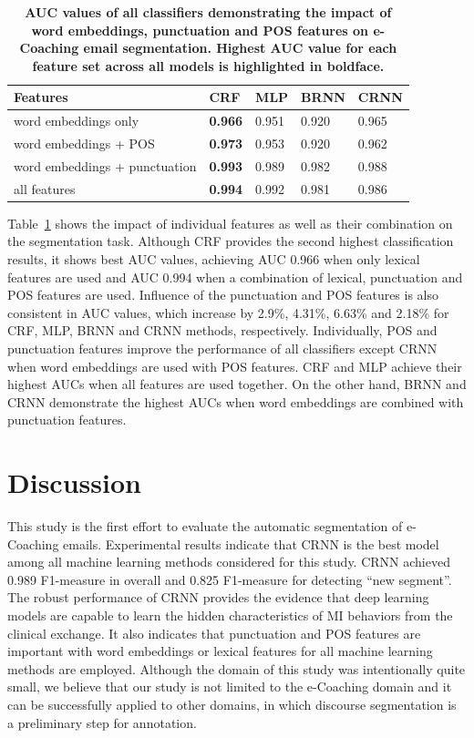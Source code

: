 \documentclass{amia}
\begin{document}
\begin{table}[ht]
\centering
\caption{\textbf{AUC values of all classifiers demonstrating the impact of word embeddings, punctuation and POS features on e-Coaching email segmentation. Highest AUC value for each feature set across all models is highlighted in boldface.}}
\label{tab:result_roc}
 \begin{tabular}{|l|l|l|l|l|}
  \hline
\textbf{Features} & \textbf{CRF} & \textbf{MLP}  & \textbf{BRNN} & \textbf{CRNN} \\ \hline      
 word embeddings only & \textbf{0.966} & 0.951 & 0.920 & 0.965 \\ \hline
 word embeddings + POS & \textbf{0.973} & 0.953 & 0.920 & 0.962 \\ \hline
 word embeddings + punctuation & \textbf{0.993} & 0.989 & 0.982 & 0.988 \\ \hline
 all features & \textbf{0.994} & 0.992 & 0.981 & 0.986 \\ \hline
  \end{tabular}
\end{table}      


Table~\ref{tab:result_roc} shows the impact of individual features as well as their combination on the segmentation task. Although CRF provides the second highest classification results, it shows best AUC values, achieving AUC 0.966 when only lexical features are used and AUC 0.994 when a combination of lexical, punctuation and POS features are used. Influence of the punctuation and POS features is also consistent in AUC values, which increase by 2.9\%, 4.31\%, 6.63\% and 2.18\% for CRF, MLP, BRNN and CRNN methods, respectively. Individually, POS and punctuation features improve the performance of all classifiers except CRNN when word embeddings are used with POS features. CRF and MLP achieve their highest AUCs when all features are used together. On the other hand, BRNN and CRNN demonstrate the highest AUCs when word embeddings are combined with punctuation features. 

\section*{Discussion}
This study is the first effort to evaluate the automatic segmentation of e-Coaching emails. Experimental results indicate that CRNN is the best model among all machine learning methods considered for this study. CRNN achieved 0.989 F1-measure in overall and 0.825 F1-measure for detecting ``new segment''. The robust performance of CRNN provides the evidence that deep learning models are capable to learn the hidden characteristics of MI behaviors from the clinical exchange. It also indicates that punctuation and POS features are important with word embeddings or lexical features for all machine learning methods are employed. Although the domain of this study was intentionally quite small, we believe that our study is not limited to the e-Coaching domain and it can be successfully applied to other domains, in which discourse segmentation is a preliminary step for annotation.
\end{document}
